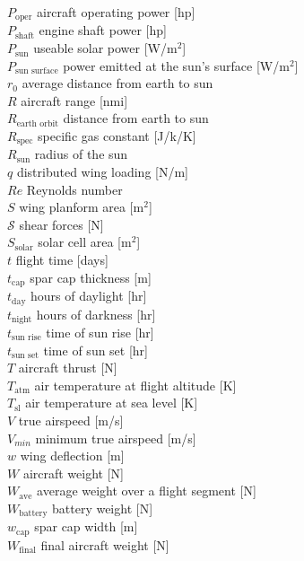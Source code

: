 \documentclass[]{aiaa-tc}%
\begin{document}
\begin{multicols}{2}
\begin{tabbing}
$P_{\text{oper}}$ \> aircraft operating power [hp] \\
$P_{\text{shaft}}$ \> engine shaft power [hp] \\
$P_{\text{sun}}$ \> useable solar power [W/m$^2$] \\
$P_{\text{sun surface}}$ \> power emitted at the sun's surface [W/m$^2$] \\
$r_0$ \> average distance from earth to sun \\
$R$ \> aircraft range [nmi] \\
$R_{\text{earth orbit}}$ \> distance from earth to sun \\
$R_{\text{spec}}$ \> specific gas constant [J/k/K] \\
$R_{\text{sun}}$ \> radius of the sun \\
$q$ \> distributed wing loading [N/m] \\
$Re$ \> Reynolds number \\
$S$ \> wing planform area [m$^2$]\\
$\mathcal{S}$ \> shear forces [N] \\
$S_{\text{solar}}$ \> solar cell area [m$^2$]\\
$t$ \> flight time [days] \\
$t_{\text{cap}}$ \> spar cap thickness [m] \\
$t_{\text{day}}$ \> hours of daylight [hr] \\
$t_{\text{night}}$ \> hours of darkness [hr] \\
$t_{\text{sun rise}}$ \> time of sun rise [hr] \\
$t_{\text{sun set}}$ \> time of sun set [hr] \\
$T$ \> aircraft thrust [N] \\
$T_{\text{atm}}$ \> air temperature at flight altitude [K] \\
$T_{\text{sl}}$ \> air temperature at sea level [K] \\
$V$ \> true airspeed [m/s] \\
$V_{min}$ \>  minimum true airspeed [m/s] \\
$w$ \> wing deflection [m] \\
$W$ \> aircraft weight [N] \\
$W_{\text{ave}}$ \> average weight over a flight segment [N] \\
$W_{\text{battery}}$ \> battery weight [N] \\
$w_{\text{cap}}$ \> spar cap width [m] \\
$W_{\text{final}}$ \> final aircraft weight [N] \\

\end{tabbing}
\end{multicols}
\end{document}
